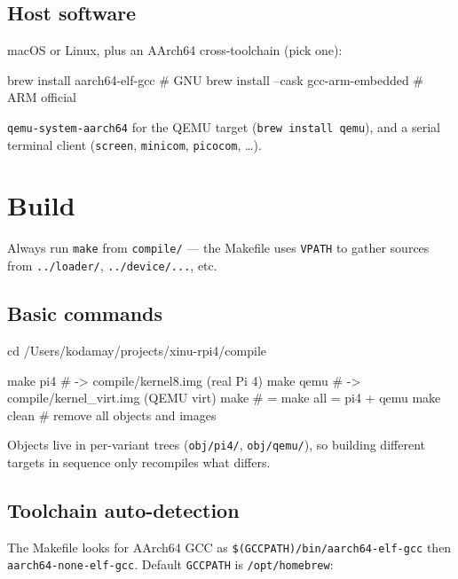 \documentclass[a4paper,11pt]{article}
\begin{document}
\subsection{Host software}
macOS or Linux, plus an AArch64 cross-toolchain (pick one):
\begin{code}
brew install aarch64-elf-gcc            # GNU
brew install --cask gcc-arm-embedded    # ARM official
\end{code}
\verb|qemu-system-aarch64| for the QEMU target (\verb|brew install qemu|), and a
serial terminal client (\verb|screen|, \verb|minicom|, \verb|picocom|, \dots).

\section{Build}

Always run \verb|make| from \verb|compile/| --- the Makefile uses \verb|VPATH|
to gather sources from \verb|../loader/|, \verb|../device/...|, etc.

\subsection{Basic commands}
\begin{code}
cd /Users/kodamay/projects/xinu-rpi4/compile

make pi4            # -> compile/kernel8.img       (real Pi 4)
make qemu           # -> compile/kernel_virt.img   (QEMU virt)
make                # = make all = pi4 + qemu
make clean          # remove all objects and images
\end{code}
Objects live in per-variant trees (\verb|obj/pi4/|, \verb|obj/qemu/|), so
building different targets in sequence only recompiles what differs.

\subsection{Toolchain auto-detection}
The Makefile looks for AArch64 GCC as \verb|$(GCCPATH)/bin/aarch64-elf-gcc|
then \verb|aarch64-none-elf-gcc|. Default \verb|GCCPATH| is \verb|/opt/homebrew|:
\end{document}
